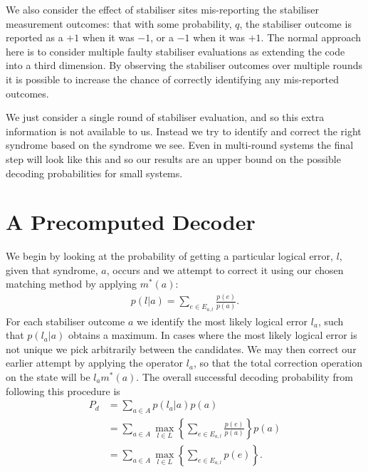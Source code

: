 We also consider the effect of stabiliser sites mis-reporting the stabiliser measurement outcomes: that with some probability, $q$, the stabiliser outcome is reported as a $+1$ when it was $-1$, or a $-1$ when it was $+1$. The normal approach here is to consider multiple faulty stabiliser evaluations as extending the code into a third dimension. By observing the stabiliser outcomes over multiple rounds it is possible to increase the chance of correctly identifying any mis-reported outcomes.

We just consider a single round of stabiliser evaluation, and so this extra information is not available to us. Instead we try to identify and correct the right syndrome based on the syndrome we see. Even in multi-round systems the final step will look like this and so our results are an upper bound on the possible decoding probabilities for small systems.

\section{A Precomputed Decoder}

We begin by looking at the probability of getting a particular logical error, $l$, given that syndrome, $a$, occurs and we attempt to correct it using our chosen matching method by applying $m^*(a)$:
\begin{align}
  p(l \vert a) = \sum_{e \in E_{a,l}} \frac{p(e)}{p(a)}. 
\end{align}
For each stabiliser outcome $a$ we identify the most likely logical error $l_a$, such that $p(l_a \vert a)$ obtains a maximum. In cases where the most likely logical error is not unique we pick arbitrarily between the candidates. We may then correct our earlier attempt by applying the operator $l_a$, so that the total correction operation on the state will be $l_am^*(a)$. The overall successful decoding probability from following this procedure is 
\begin{align}
  P_d &= \sum_{a \in A} p(l_a \vert a)p(a) \\
  &= \sum_{a \in A} \max_{l\in L} \left\{ \sum_{e \in E_{a,l}} \frac{p(e)}{p(a)} \right\} p(a) \\
  &= \sum_{a \in A} \max_{l\in L} \left\{ \sum_{e \in E_{a,l}} p(e) \right\}. \label{truthful_prob}
\end{align}

